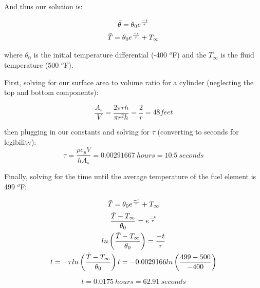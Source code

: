 \documentclass{article}
\begin{document}
And thus our solution is:

\begin{equation}
    \begin{gathered}
        \Bar{\theta} = \theta_0 e^{\frac{-t}{\tau}} \\
        \Bar{T} = \theta_0 e^{\frac{-t}{\tau}} + T_{\infty}
    \end{gathered}
\end{equation}

where $\theta_0$ is the initial temperature differential (-400 $^o$F) and the $T_{\infty}$ is the fluid temperature (500 $^o$F). 

First, solving for our surface area to volume ratio for a cylinder (neglecting the top and bottom components):

\begin{equation}
    \frac{A_s}{V} = \frac{2\pi rh}{\pi r^2h} = \frac{2}{r} = 48 feet
\end{equation}

then plugging in our constants and solving for $\tau$ (converting to seconds for legibility):
\[
\boxed{\tau = \frac{\rho c_p V}{h A_s} = 0.00291667 \ hours = 10.5 \ seconds}
\]

Finally, solving for the time until the average temperature of the fuel element is 499 $^o$F:

\begin{equation}
    \begin{gathered}
        \Bar{T} = \theta_0 e^{\frac{-t}{\tau}} + T_{\infty} \\
        \frac{\Bar{T} - T_{\infty}}{\theta_0} = e^{\frac{-t}{\tau}} \\
        ln\left(\frac{\Bar{T} - T_{\infty}}{\theta_0}\right) = \frac{-t}{\tau} \\
        t = -\tau ln\left(\frac{\Bar{T} - T_{\infty}}{\theta_0}\right)
        t = - 0.0029166 ln\left(\frac{499 - 500}{-400}\right)
    \end{gathered}
\end{equation}

\[
\boxed{t = 0.0175 \ hours = 62.91 \ seconds}
\]
\end{document}
